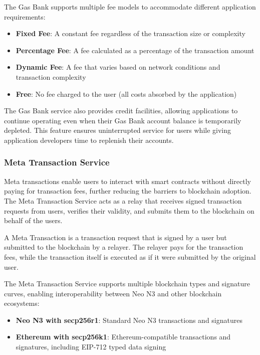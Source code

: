 The Gas Bank supports multiple fee models to accommodate different application requirements:

\begin{itemize}
    \item \textbf{Fixed Fee}: A constant fee regardless of the transaction size or complexity
    \item \textbf{Percentage Fee}: A fee calculated as a percentage of the transaction amount
    \item \textbf{Dynamic Fee}: A fee that varies based on network conditions and transaction complexity
    \item \textbf{Free}: No fee charged to the user (all costs absorbed by the application)
\end{itemize}

The Gas Bank service also provides credit facilities, allowing applications to continue operating even when their Gas Bank account balance is temporarily depleted. This feature ensures uninterrupted service for users while giving application developers time to replenish their accounts.

\subsubsection{Meta Transaction Service}
\label{subsubsec:meta-tx}

Meta transactions enable users to interact with smart contracts without directly paying for transaction fees, further reducing the barriers to blockchain adoption. The Meta Transaction Service acts as a relay that receives signed transaction requests from users, verifies their validity, and submits them to the blockchain on behalf of the users.



\begin{definition}
A Meta Transaction is a transaction request that is signed by a user but submitted to the blockchain by a relayer. The relayer pays for the transaction fees, while the transaction itself is executed as if it were submitted by the original user.
\end{definition}

The Meta Transaction Service supports multiple blockchain types and signature curves, enabling interoperability between Neo N3 and other blockchain ecosystems:

\begin{itemize}
    \item \textbf{Neo N3 with secp256r1}: Standard Neo N3 transactions and signatures
    \item \textbf{Ethereum with secp256k1}: Ethereum-compatible transactions and signatures, including EIP-712 typed data signing
\end{itemize}

